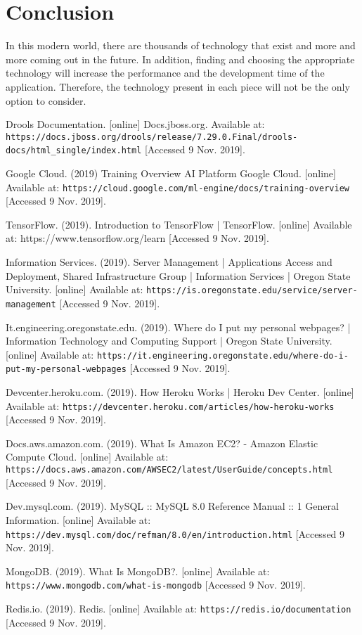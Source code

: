 \documentclass[onecolumn, draftclsnofoot,10pt, compsoc]{IEEEtran}
\begin{document}
\section{Conclusion}
In this modern world, there are thousands of technology that exist and more and more coming out in the future. In addition, finding and choosing the appropriate technology will increase the performance and the development time of the application. Therefore, the technology present in each piece will not be the only option to consider.  

\begin{thebibliography}{}
Drools Documentation. [online] Docs.jboss.org. Available at:\\ \texttt{https://docs.jboss.org/drools/release/7.29.0.Final/drools-docs/html_single/index.html} [Accessed 9 Nov. 2019].

Google Cloud. (2019) Training Overview AI Platform Google Cloud. [online] Available at: \texttt{https://cloud.google.com/ml-engine/docs/training-overview} [Accessed 9 Nov. 2019].

TensorFlow. (2019). Introduction to TensorFlow  |  TensorFlow. [online] Available at: https://www.tensorflow.org/learn [Accessed 9 Nov. 2019].

Information Services. (2019). Server Management | Applications Access and Deployment, Shared Infrastructure Group | Information Services | Oregon State University. [online] Available at: \texttt{https://is.oregonstate.edu/service/server-management} [Accessed 9 Nov. 2019].

It.engineering.oregonstate.edu. (2019). Where do I put my personal webpages? | Information Technology and Computing Support | Oregon State University. [online] Available at: \texttt{https://it.engineering.oregonstate.edu/where-do-i-put-my-personal-webpages} [Accessed 9 Nov. 2019].

Devcenter.heroku.com. (2019). How Heroku Works | Heroku Dev Center. [online] Available at: \texttt{https://devcenter.heroku.com/articles/how-heroku-works} [Accessed 9 Nov. 2019].

Docs.aws.amazon.com. (2019). What Is Amazon EC2? - Amazon Elastic Compute Cloud. [online] Available at: \texttt{https://docs.aws.amazon.com/AWSEC2/latest/UserGuide/concepts.html} [Accessed 9 Nov. 2019].

Dev.mysql.com. (2019). MySQL :: MySQL 8.0 Reference Manual :: 1 General Information. [online] Available at: \texttt{https://dev.mysql.com/doc/refman/8.0/en/introduction.html} [Accessed 9 Nov. 2019].

MongoDB. (2019). What Is MongoDB?. [online] Available at: \texttt{https://www.mongodb.com/what-is-mongodb} [Accessed 9 Nov. 2019].

Redis.io. (2019). Redis. [online] Available at: \texttt{https://redis.io/documentation} [Accessed 9 Nov. 2019].

\end{thebibliography}
\end{document}
